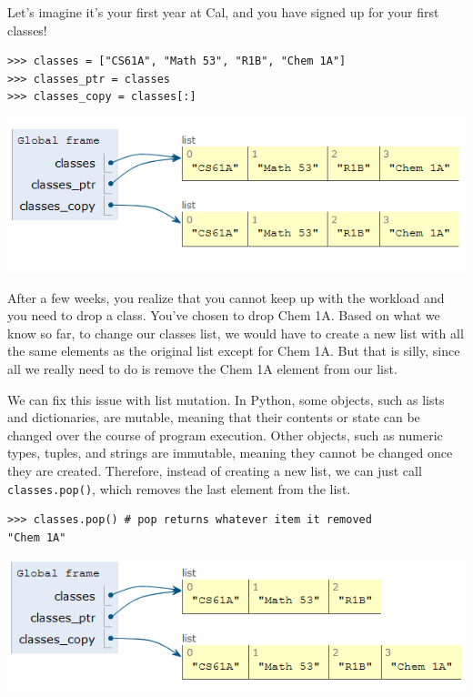 Let’s imagine it’s your first year at Cal, and you have signed up for your first classes!
\begin{lstlisting}
>>> classes = ["CS61A", "Math 53", "R1B", "Chem 1A"]
>>> classes_ptr = classes
>>> classes_copy = classes[:]
\end{lstlisting}

\begin{center}
\includegraphics[scale=0.75]{pointers.PNG}
\end{center}
After a few weeks, you realize that you cannot keep up with the workload and you need to drop a class. You’ve chosen to drop Chem 1A. Based on what we know so far, to change our classes list, we would have to create a new list with all the same elements as the original list except for Chem 1A. But that is silly, since all we really need to do is remove the Chem 1A element from our list.

We can fix this issue with list mutation. In Python, some objects, such as lists and dictionaries, are mutable, meaning that their contents or state can be changed over the course of program execution. Other objects, such as numeric types, tuples, and strings are immutable, meaning they cannot be changed once they are created. Therefore, instead of creating a new list, we can just call \lstinline{classes.pop()}, which removes the last element from the list.
\newpage
\begin{lstlisting}
>>> classes.pop() # pop returns whatever item it removed
"Chem 1A"
\end{lstlisting}

\begin{center}
\includegraphics[scale=0.75]{pointers_mutate.PNG}
\end{center}

